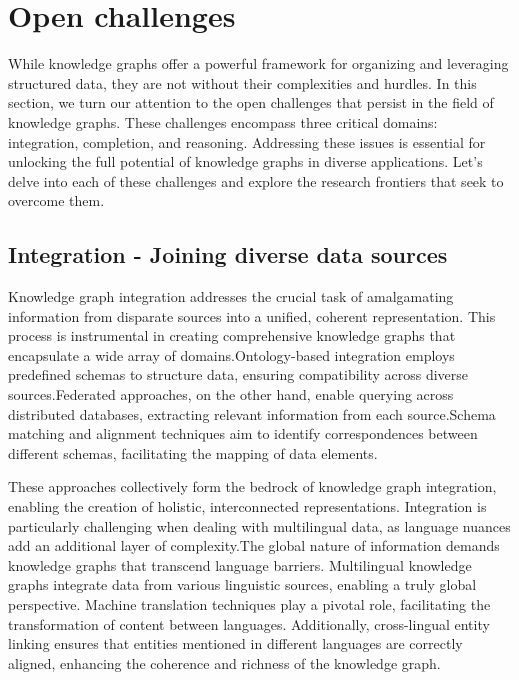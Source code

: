 
\section{Open challenges}\label{sec:kgs-challenges}
While knowledge graphs offer a powerful framework for organizing and leveraging structured data, they are not without their complexities and hurdles. In this section, we turn our attention to the open challenges that persist in the field of knowledge graphs. These challenges encompass three critical domains: integration, completion, and reasoning. Addressing these issues is essential for unlocking the full potential of knowledge graphs in diverse applications. Let's delve into each of these challenges and explore the research frontiers that seek to overcome them.

\subsection{Integration - Joining diverse data sources}
Knowledge graph integration addresses the crucial task of amalgamating information from disparate sources into a unified, coherent representation. This process is instrumental in creating comprehensive knowledge graphs that encapsulate a wide array of domains.Ontology-based integration employs predefined schemas to structure data, ensuring compatibility across diverse sources.Federated approaches, on the other hand, enable querying across distributed databases, extracting relevant information from each source.Schema matching and alignment techniques aim to identify correspondences between different schemas, facilitating the mapping of data elements.

These approaches collectively form the bedrock of knowledge graph integration, enabling the creation of holistic, interconnected representations. Integration is particularly challenging when dealing with multilingual data, as language nuances add an additional layer of complexity.The global nature of information demands knowledge graphs that transcend language barriers. Multilingual knowledge graphs integrate data from various linguistic sources, enabling a truly global perspective. Machine translation techniques play a pivotal role, facilitating the transformation of content between languages. Additionally, cross-lingual entity linking ensures that entities mentioned in different languages are correctly aligned, enhancing the coherence and richness of the knowledge graph.


